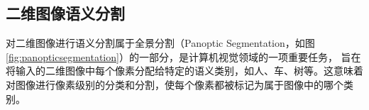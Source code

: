 \subsection{二维图像语义分割}


\par 对二维图像进行语义分割属于全景分割（Panoptic Segmentation，如图\ref{fig:panopticsegmentation}）\cite{panopticsegmentation}的一部分，是计算机视觉领域的一项重要任务，
旨在将输入的二维图像中每个像素分配给特定的语义类别，如人、车、树等。这意味着对图像进行像素级别的分类和分割，使每个像素都被标记为属于图像中的哪个类别。
\begin{figure}[htbp]
	\centering


\end{figure}
